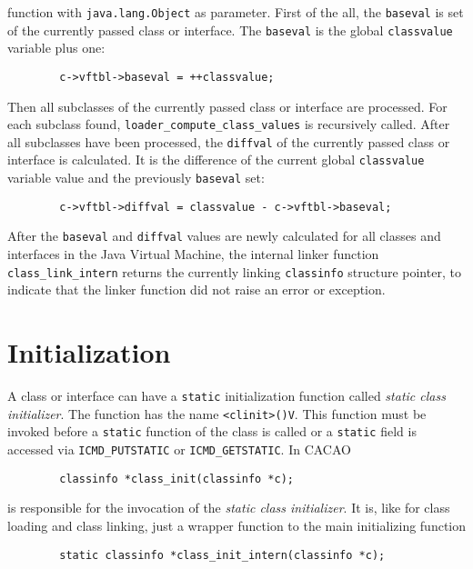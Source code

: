 function with \texttt{java.lang.Object} as parameter. First of the
all, the \texttt{baseval} is set of the currently passed class or
interface. The \texttt{baseval} is the global \texttt{classvalue}
variable plus one:

\begin{verbatim}
        c->vftbl->baseval = ++classvalue;
\end{verbatim}

Then all subclasses of the currently passed class or interface are
processed. For each subclass found,
\texttt{loader\_compute\_class\_values} is recursively called. After
all subclasses have been processed, the \texttt{diffval} of the
currently passed class or interface is calculated. It is the
difference of the current global \texttt{classvalue} variable value
and the previously \texttt{baseval} set:

\begin{verbatim}
        c->vftbl->diffval = classvalue - c->vftbl->baseval;
\end{verbatim}

After the \texttt{baseval} and \texttt{diffval} values are newly
calculated for all classes and interfaces in the Java Virtual Machine,
the internal linker function \texttt{class\_link\_intern} returns the
currently linking \texttt{classinfo} structure pointer, to indicate
that the linker function did not raise an error or exception.


\section{Initialization}
\label{sectioninitialization}

A class or interface can have a \texttt{static} initialization
function called \textit{static class initializer}. The function has
the name \texttt{<clinit>()V}. This function must be invoked before a
\texttt{static} function of the class is called or a \texttt{static}
field is accessed via \texttt{ICMD\_PUTSTATIC} or
\texttt{ICMD\_GETSTATIC}. In CACAO

\begin{verbatim}
        classinfo *class_init(classinfo *c);
\end{verbatim}

is responsible for the invocation of the \textit{static class
initializer}. It is, like for class loading and class linking, just a
wrapper function to the main initializing function

\begin{verbatim}
        static classinfo *class_init_intern(classinfo *c);
\end{verbatim}

